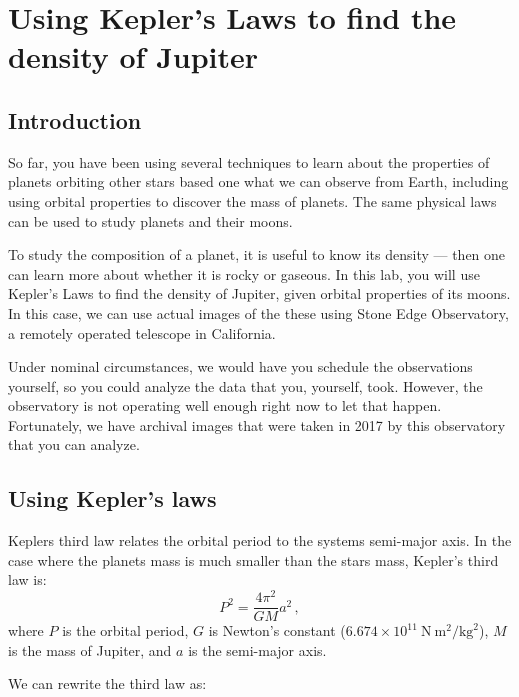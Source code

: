 \chapter{Using Kepler’s Laws to find the density of Jupiter}


\section{Introduction}

So far, you have been using several techniques to learn about the properties of planets orbiting other stars based one what we can observe from Earth, including using orbital properties to discover the mass of planets. The same physical laws can be used to study planets and their moons.

To study the composition of a planet, it is useful to know its density --- then one can learn more about whether it is rocky or gaseous. In this lab, you will use Kepler's Laws to find the density of Jupiter, given orbital properties of its moons. In this case, we can use actual images of the these using Stone Edge Observatory, a remotely operated telescope in California.

Under nominal circumstances, we would have you schedule the observations yourself, so you could analyze the data that you, yourself, took. However, the observatory is not operating well enough right now to let that happen. Fortunately, we have archival images that were taken in 2017 by this observatory that you can analyze.

\section{Using Kepler's laws}

Keplers third law relates the orbital period to the systems semi-major axis. In the case where the planets mass is much smaller than the stars mass, Kepler's third law is:
\begin{equation}
P^2 = \frac{4\pi^2}{G M}a^2 \,,
\end{equation}
where $P$ is the orbital period, $G$ is Newton's constant ($6.674 \times 10^{11}\:\textrm{N}\:\textrm{m}^2/\textrm{kg}^2$), $M$ is the mass of Jupiter, and $a$ is the semi-major axis.

We can rewrite the third law as:

